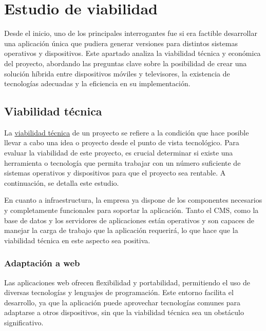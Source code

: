 \section{Estudio de viabilidad}
\label{sec:analisis_estudio_viabilidad}

Desde el inicio, uno de los principales interrogantes fue si era factible desarrollar una aplicación única 
que pudiera generar versiones para distintos sistemas operativos y dispositivos. Este apartado analiza la 
viabilidad técnica y económica del proyecto, abordando las preguntas clave sobre la posibilidad de crear 
una solución híbrida entre dispositivos móviles y televisores, la existencia de tecnologías adecuadas y 
la eficiencia en su implementación.

\subsection{Viabilidad técnica}
\label{subsec:analisis_estudio_viabilidad_tecnica}

La \href{https://es.wikipedia.org/wiki/Viabilidad_t%C3%A9cnica#:~:text=Condici%C3%B3n%20que%20hace%20posible%20el,leyes%20de%20la%20naturaleza%20involucradas.}{viabilidad técnica} 
de un proyecto se refiere a la condición que hace posible llevar a cabo una idea o proyecto desde el punto de 
vista tecnológico. Para evaluar la viabilidad de este proyecto, es crucial determinar si existe una herramienta 
o tecnología que permita trabajar con un número suficiente de sistemas operativos y dispositivos para que el 
proyecto sea rentable. A continuación, se detalla este estudio.

En cuanto a infraestructura, la empresa ya dispone de los componentes necesarios y completamente funcionales 
para soportar la aplicación. Tanto el CMS, como la base de datos y los servidores de aplicaciones están operativos 
y son capaces de manejar la carga de trabajo que la aplicación requerirá, lo que hace que la viabilidad técnica 
en este aspecto sea positiva.

\subsubsection{Adaptación a web}
\label{subsubsec:analisis_estudio_viabilidad_tecnica_aplicacion_web}

Las aplicaciones web ofrecen flexibilidad y portabilidad, permitiendo el uso de diversas tecnologías y 
lenguajes de programación. Este entorno facilita el desarrollo, ya que la aplicación puede aprovechar 
tecnologías comunes para adaptarse a otros dispositivos, sin que la viabilidad técnica sea un obstáculo significativo.

